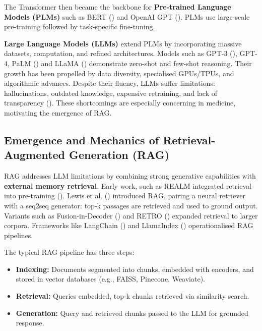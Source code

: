 The Transformer then became the backbone for \textbf{Pre-trained Language Models (PLMs)} such as BERT (\citep{devlin2019bert}) and OpenAI GPT (\citep{radford2019language}). PLMs use large-scale pre-training followed by task-specific fine-tuning.

\textbf{Large Language Models (LLMs)} extend PLMs by incorporating massive datasets, computation, and refined architectures. Models such as GPT-3 (\citep{brown2020language}), GPT-4, PaLM (\citep{chowdhery2022palm}) and LLaMA (\citep{touvron2023llama}) demonstrate zero-shot and few-shot reasoning. Their growth has been propelled by data diversity, specialised GPUs/TPUs, and algorithmic advances. Despite their fluency, LLMs suffer limitations: hallucinations, outdated knowledge, expensive retraining, and lack of transparency (\citep{ji2023survey}). These shortcomings are especially concerning in medicine, motivating the emergence of RAG.

\subsection{Emergence and Mechanics of Retrieval-Augmented Generation (RAG)}

RAG addresses LLM limitations by combining strong generative capabilities with \textbf{external memory retrieval}. Early work, such as REALM integrated retrieval into pre-training (\citep{guu2020realm}). Lewis et al. (\citeyear{lewis2020rag}) introduced RAG, pairing a neural retriever with a seq2seq generator: top-k passages are retrieved and used to ground output. Variants such as Fusion-in-Decoder (\citep{izacard2021leveraging}) and RETRO (\citep{borgeaud2022retro}) expanded retrieval to larger corpora. Frameworks like LangChain (\citep{langchain2023}) and LlamaIndex (\citep{llamaindex2023}) operationalised RAG pipelines.

The typical RAG pipeline has three steps:
\begin{itemize}
  \item \textbf{Indexing:} Documents segmented into chunks, embedded with encoders, and stored in vector databases (e.g., FAISS, Pinecone, Weaviate).
  \item \textbf{Retrieval:} Queries embedded, top-k chunks retrieved via similarity search.
  \item \textbf{Generation:} Query and retrieved chunks passed to the LLM for grounded response.
\end{itemize}

